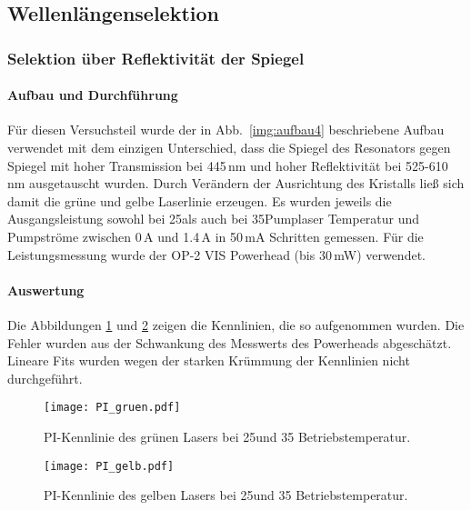 \subsection{Wellenlängenselektion}

\subsubsection{Selektion über Reflektivität der Spiegel}

\paragraph{Aufbau und Durchführung}

Für diesen Versuchsteil wurde der in Abb.~\ref{img:aufbau4} beschriebene Aufbau verwendet mit dem
einzigen Unterschied, dass die Spiegel des Resonators gegen Spiegel mit hoher Transmission bei
445\,nm und hoher Reflektivität bei 525-610\,nm ausgetauscht wurden.
Durch Verändern der Ausrichtung des Kristalls ließ sich damit die grüne und gelbe Laserlinie
erzeugen. Es wurden jeweils die Ausgangsleistung sowohl bei 25\grad als auch bei 35\grad Pumplaser
Temperatur und Pumpströme zwischen 0\,A und 1.4\,A in 50\,mA Schritten gemessen.
Für die Leistungsmessung wurde der OP-2 VIS Powerhead (bis 30\,mW) verwendet.


\paragraph{Auswertung}
Die Abbildungen \ref{img:PI_gruen} und \ref{img:PI_gelb} zeigen die Kennlinien,
die so aufgenommen wurden.
Die Fehler wurden aus der Schwankung des Messwerts des Powerheads abgeschätzt.
Lineare Fits wurden wegen der starken Krümmung der Kennlinien nicht durchgeführt.

\begin{figure}[H]
\begin{center}
  \texttt{[image: PI\_gruen.pdf]}
  \caption{PI-Kennlinie des grünen Lasers bei 25\grad und 35\grad
  Betriebstemperatur.}
  \label{img:PI_gruen}
\end{center}
\end{figure}


\begin{figure}[H]
\begin{center}
  \texttt{[image: PI\_gelb.pdf]}
  \caption{PI-Kennlinie des gelben Lasers bei 25\grad und 35\grad
  Betriebstemperatur.}
  \label{img:PI_gelb}
\end{center}
\end{figure}



